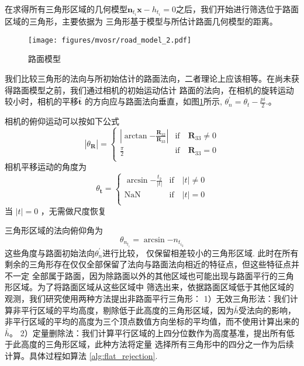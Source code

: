 在求得所有三角形区域的几何模型$\mathbf{n}_{t_i}\mathbf{x}-h_{t_i}=0$之后，我们开始进行筛选位于路面区域的三角形，主要依据为
三角形基于模型与所估计路面几何模型的距离。
\begin{figure}[t]
    \centering
    \texttt{[image: figures/mvosr/road\_model\_2.pdf]}
    \caption{路面模型}
    \label{fig:mvosr_road_model}
  \end{figure}

我们比较三角形的法向与所初始估计的路面法向，二者理论上应该相等。在尚未获得路面模型之前，我们通过相机的初始运动估计
路面的法向，在相机的旋转运动较小时，相机的平移$\mathbf{\bar{t}}$ 的方向应与路面法向垂直，如图\ref{fig:mvosr_road_model}所示,
$\theta_n^{\prime} = \theta_t -\frac{pi}{2}$.。

相机的俯仰运动可以按如下公式
\begin{equation}
    \label{eq:pitch_r}
    |\theta_{\mathbf{R}}| = 
    \begin{cases}
        |\arctan{-\frac{\mathbf{R}_{32}}{\mathbf{R}_{33}}}| &  \text{if} \quad \mathbf{R}_{33} \neq 0 \\
        \frac{\pi}{2}& \text{if} \quad \mathbf{R}_{33} = 0 \\
    \end{cases}
\end{equation}
相机平移运动的角度为
\begin{equation}
    \label{eq:pitch_t}
    \theta_{\mathbf{t}} =
    \begin{cases}
        \arcsin{-\frac{t_{2}}{|t|}} & \text{if} \quad |t| \neq 0 \\
        \text{NaN} & \text{if} \quad |t| = 0 \\
    \end{cases}
\end{equation}
当 $|t|=0$ ，无需做尺度恢复

三角形区域的法向俯仰角为
\begin{equation}
    \label{eq:pitch_n_triangle}
    \theta_{n_{t_i}} = \arcsin{-n_{t_{i_2}}}
\end{equation}
这些角度与路面初始法向$\theta_{n}^{\prime}$进行比较， 仅保留相差较小的三角形区域. 
此时在所有剩余的三角形存在仅仅全部保留了法向与路面法向相近的特征点，但这些特征点并不一定
全部属于路面，因为除路面以外的其他区域也可能出现与路面平行的三角形区域。为了将路面区域从这些区域中
筛选出来，依据路面区域低于其他区域的观测，我们研究使用两种方法提出非路面平行三角形：
1）无效三角形法：我们计算非平行区域的平均高度，剔除低于此高度的三角形区域，因为$\bar{h}$受法向的影响，
非平行区域的平均的高度为三个顶点数值方向坐标的平均值，而不使用计算出来的$\bar{h}$。
2）定量删除法：我们计算平行区域的上四分位数作为高度基准，提出所有低于此高度的三角形区域，此种方法将定量
选择所有三角形中的四分之一作为后续计算。具体过程如算法 \ref{alg:flat_rejection}.



